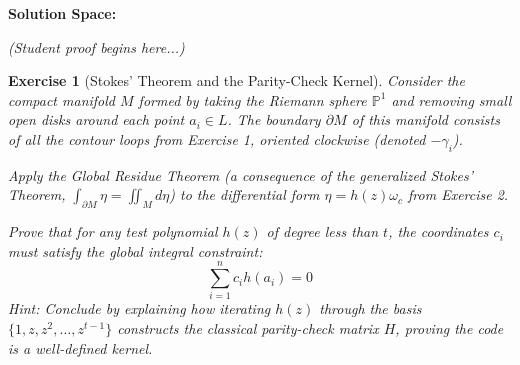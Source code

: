 \documentclass[11pt]{article}
\newtheorem{problem}{Exercise}
\begin{document}
	\begin{mdframed}[backgroundcolor=gray!5, linecolor=gray!50, linewidth=1pt]
		\textbf{Solution Space:}
		
		\vspace{0.5cm}
		\textit{(Student proof begins here...)}
		
	\end{mdframed}
	
	\newpage
	\thispagestyle{plain}
	
	\begin{problem}[Stokes' Theorem and the Parity-Check Kernel]
		Consider the compact manifold $M$ formed by taking the Riemann sphere $\mathbb{P}^1$ and removing small open disks around each point $a_i \in L$. The boundary $\partial M$ of this manifold consists of all the contour loops from Exercise 1, oriented clockwise (denoted $-\gamma_i$).
		
		Apply the Global Residue Theorem (a consequence of the generalized Stokes' Theorem, $\int_{\partial M} \eta = \iint_M d\eta$) to the differential form $\eta = h(z) \omega_c$ from Exercise 2. 
		
		Prove that for any test polynomial $h(z)$ of degree less than $t$, the coordinates $c_i$ must satisfy the global integral constraint:
		$$ \sum_{i=1}^n c_i h(a_i) = 0 $$
		\textit{Hint: Conclude by explaining how iterating $h(z)$ through the basis $\{1, z, z^2, \dots, z^{t-1}\}$ constructs the classical parity-check matrix $H$, proving the code is a well-defined kernel.}
	\end{problem}
	
	\vspace{0.5cm}
	
\end{document}
